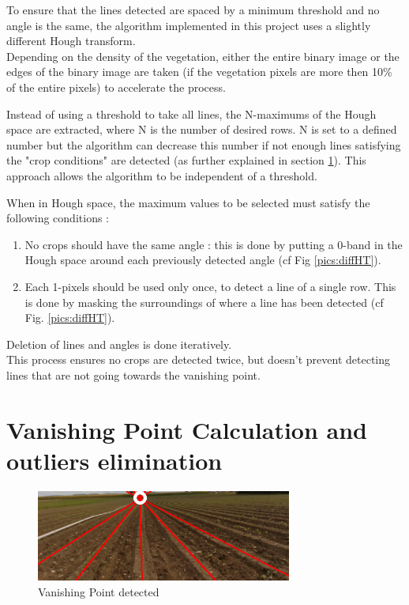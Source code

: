 To ensure that the lines detected are spaced by a minimum threshold and no angle is the same, the algorithm implemented in this project uses a slightly different Hough transform.\\

Depending on the density of the vegetation, either the entire binary image or the edges of the binary image are taken (if the vegetation pixels are more then 10\% of the entire pixels) to accelerate the process.

Instead of using a threshold to take all lines, the N-maximums of the Hough space are extracted, where N is the number of desired rows. N is set to a defined number but the algorithm  can decrease this number if not enough lines satisfying the "crop conditions" are detected (as further explained in section \ref{sec:VPdet}). This approach allows the algorithm to be independent of a threshold.

When in Hough space, the maximum values to be selected must satisfy the following conditions : 
\begin{enumerate}
    \item No crops should have the same angle : this is done by putting a 0-band in the Hough space around each previously detected angle (cf Fig \ref{pics:diffHT}).
    \item Each 1-pixels should be used only once, to detect a line of a single row. This is done by masking the surroundings of where a line has been detected (cf Fig. \ref{pics:diffHT}). 
\end{enumerate}

Deletion of lines and angles is done iteratively.\\

This process ensures no crops are detected twice, but doesn't prevent detecting lines that are not going towards the vanishing point. 




\section{Vanishing Point Calculation and outliers elimination}
\label{sec:VPdet}

\begin{figure}[H]
   \centering
   \includegraphics[width=0.75\textwidth]{Report/images/VPdetected.png}
   \caption{Vanishing Point detected}
   \label{pics:VPillu}
\end{figure}

